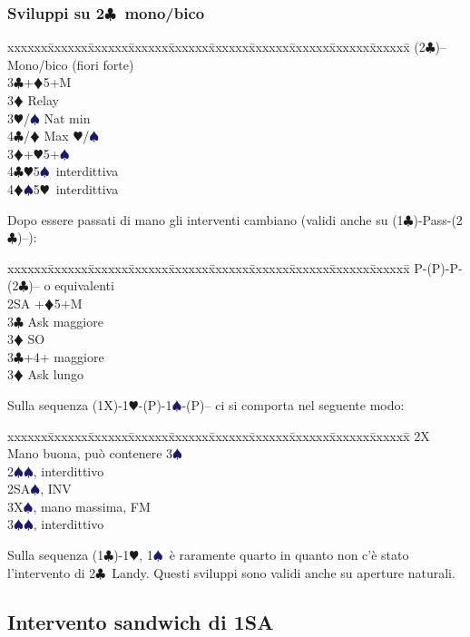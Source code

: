 \documentclass[a4paper,italian]{article}
\newcommand{\BC}{\textcolor{OliveGreen}{$\clubsuit$}}
\newcommand{\BD}{\textcolor{RedOrange}{$\vardiamondsuit$}}
\newcommand{\BH}{\textcolor{Red2}{$\varheartsuit${}}}
\newcommand{\BS}{\textcolor{MidnightBlue}{$\spadesuit${}}}
\newcommand{\pdfc}{\texorpdfstring{\BC{}}{C}}
\newenvironment{bidtable}
{\begin{tabbing}

    xxxxxx\=xxxxxx\=xxxxxx\=xxxxxx\=xxxxxx\=xxxxxx\=xxxxxx\=xxxxxx\=xxxxxx\=xxxxxx\=\kill}
{\end{tabbing} }%
\newenvironment{sviluppi}
{\begin{tcolorbox}[colframe=azzurro,title=Sviluppi particolari]}
    {
\end{tcolorbox} }%
\begin{document}
\begin{multicols}{2}
    \subsubsection{Sviluppi su 2\pdfc\ mono/bico}

    \begin{bidtable}
        (2\BC)-- \> Mono/bico (fiori forte)\+\\
        3\BC {}+\BD 5+M\+\\
        3\BD \> Relay\+\\
        3\BH/\BS \> Nat min\\
        4\BC/\BD \> Max \BH /\BS \-\-\\
        3\BD {}+\BH 5+\BS \\
        4\BC {}\BH 5\BS\ interdittiva\\
        4\BD {}\BS 5\BH\ interdittiva
    \end{bidtable}
    Dopo essere passati di mano gli interventi cambiano (validi anche su (1\BC )-Pass-(2\BC )--):
    \begin{bidtable}
        P-(P)-P-(2\BC)-- o equivalenti\+\\
        2SA +\BD 5+M\+\\
        3\BC \> Ask maggiore\\
        3\BD \> SO\-\\
        3\BC {}+4+ maggiore\+\\
        3\BD \> Ask lungo
    \end{bidtable}

    \begin{sviluppi}
        Sulla sequenza (1X)-1\BH-(P)-1\BS-(P)-- ci si comporta nel seguente modo:
        \begin{bidtable}
            2X\> Mano buona, può contenere 3\BS\\
            2\BS{}\BS, interdittivo\\
            2SA\BS, INV\\
            3X\BS, mano massima, FM\\
            3\BS{}\BS, interdittivo
        \end{bidtable}
        Sulla sequenza (1\BC)-1\BH, 1\BS\ è raramente quarto in quanto non c'è stato l'intervento di 2\BC\ Landy.
        Questi sviluppi sono validi anche su aperture naturali.

    \end{sviluppi}

    \subsection{Intervento sandwich di 1SA}


\end{multicols}
\end{document}
